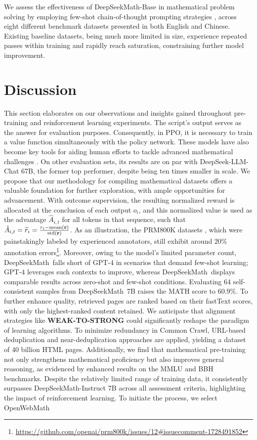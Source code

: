 \begin{itemize}[topsep=0pt]
\begin{itemize}[topsep=0pt]
\begin{itemize}[topsep=0pt]
\begin{itemize}[topsep=0pt]
We assess the effectiveness of DeepSeekMath-Base in mathematical problem solving by employing few-shot chain-of-thought prompting strategies \citep{cot}, across eight different benchmark datasets presented in both English and Chinese. Existing baseline datasets, being much more limited in size, experience repeated passes within training and rapidly reach saturation, constraining further model improvement. \section{Discussion}
This section elaborates on our observations and insights gained throughout pre-training and reinforcement learning experiments. The script’s output serves as the answer for evaluation purposes. Consequently, in PPO, it is necessary to train a value function simultaneously with the policy network. These models have also become key tools for aiding human efforts to tackle advanced mathematical challenges \citep{tao}. On other evaluation sets, its results are on par with DeepSeek-LLM-Chat 67B, the former top performer, despite being ten times smaller in scale. We propose that our methodology for compiling mathematical datasets offers a valuable foundation for further exploration, with ample opportunities for advancement. With outcome supervision, the resulting normalized reward is allocated at the conclusion of each output $o_i$, and this normalized value is used as the advantage $\hat{A}_{i, t}$ for all tokens in that sequence, such that $\hat{A}_{i, t} = \widetilde{r}_i = \frac{r_i- {\rm mean}(\mathbf{r})}{{\rm std}(\mathbf{r})}$. As an illustration, the PRM800K datasets \citep{lightman2023let}, which were painstakingly labeled by experienced annotators, still exhibit around 20\% annotation errors\footnote{\url{https://github.com/openai/prm800k/issues/12\#issuecomment-1728491852}}. Moreover, owing to the model’s limited parameter count, DeepSeekMath~falls short of GPT-4 in scenarios that demand few-shot learning; GPT-4 leverages such contexts to improve, whereas DeepSeekMath~displays comparable results across zero-shot and few-shot conditions. Evaluating 64 self-consistent samples from DeepSeekMath~7B raises the MATH score to 60.9\%. To further enhance quality, retrieved pages are ranked based on their fastText scores, with only the highest-ranked content retained. We anticipate that alignment strategies like \textbf{WEAK-TO-STRONG} \citep{burns2023weak} could significantly reshape the paradigm of learning algorithms. To minimize redundancy in Common Crawl, URL-based deduplication and near-deduplication approaches are applied, yielding a dataset of 40 billion HTML pages. Additionally, we find that mathematical pre-training not only strengthens mathematical proficiency but also improves general reasoning, as evidenced by enhanced results on the MMLU \citep{mmlu} and BBH \citep{bbh} benchmarks. Despite the relatively limited range of training data, it consistently surpasses DeepSeekMath-Instruct 7B across all assessment criteria, highlighting the impact of reinforcement learning. To initiate the process, we select OpenWebMath 
\end{itemize}
\end{itemize}
\end{itemize}
\end{itemize}
